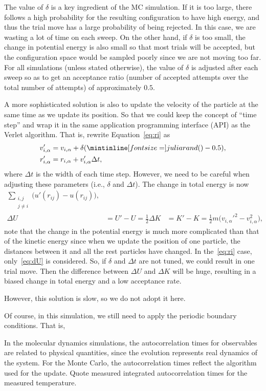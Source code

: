 The value of \(\delta\) is a key
ingredient of the MC simulation. If it is too large, there follows a high probability
for the resulting configuration to have high energy, and thus the trial move has a
large probability of being rejected.
In this case, we are wasting a lot of time on each sweep.
On the other hand, if \(\delta\) is too small, the change in
potential energy is also small so that most trials will be accepted, but the configuration
space would be sampled poorly since we are not moving too far.
For all simulations (unless stated otherwise), the
value of \(\delta\) is adjusted after each sweep so as to get an acceptance ratio (number of
accepted attempts over the total number of attempts) of approximately \(0.5\).

A more sophisticated solution is also to update the velocity of the particle
at the same time as we update its position. So that we could keep the concept of
``time step'' and wrap it in the same application programming interface (API)
as the Verlet algorithm.
That is, rewrite Equation~\eqref{eq:ri} as
%
\begin{align}
    v_{i, \alpha}' & = v_{i, \alpha} + \delta (\code{rand()} - 0.5), \\
    r_{i, \alpha}' & = r_{i, \alpha} + v_{i, \alpha}' \Delta t,
\end{align}
%
where \(\Delta t\) is the width of each time step.
However, we need to be careful when adjusting these parameters (i.e., \(\delta\) and
\(\Delta t\)). The change in total energy is now
%
\begin{align}
    \sum_{\substack{i, j \\ j \neq i}} \bigl(u'(r_{ij}) - u(r_{ij})\bigr),\label{eq:dU} \\
    \Delta U & = U' - U = \frac{1}{2}
    \Delta K & = K' - K = \frac{1}{2} m \bigl(v_{i, \alpha}'^2 - v_{i, \alpha}^2\bigr),
\end{align}
%
note that the change in the potential energy is much more complicated than that of the
kinetic energy since when we update the position of one particle, the distances
between it and all the rest particles have changed.
In the~\eqref{eq:ri} case, only~\eqref{eq:dU} is considered.
So, if \(\delta\) and \(\Delta t\) are not tuned, we could result in one trial move.
Then the difference between \(\Delta U\) and \(\Delta K\) will be huge, resulting in a
biased change in total energy and a low acceptance rate.

However, this solution is slow, so we do not adopt it here.


Of course, in this simulation, we still need to apply the periodic boundary conditions.
That is,

\Question{}
In the molecular dynamics simulations, the autocorrelation times for observables are related
to physical quantities, since the evolution represents real dynamics of the system. For the
Monte Carlo, the autocorrelation times reflect the algorithm used for the update. Quote
measured integrated autocorrelation times for the measured temperature.

\Answer{}
